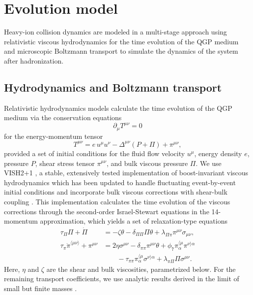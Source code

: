\documentclass[aps,prc,reprint,amsmath,nofootinbib,noeprint]{revtex4-1}
\begin{document}
\section{Evolution model}

Heavy-ion collision dynamics are modeled in a multi-stage approach using relativistic viscous hydrodynamics for the time evolution of the QGP medium and microscopic Boltzmann transport to simulate the dynamics of the system after hadronization.

\subsection{Hydrodynamics and Boltzmann transport}

Relativistic hydrodynamics models calculate the time evolution of the QGP medium via the conservation equations
\begin{equation}
  \partial_\mu T^{\mu\nu} = 0
  \label{eq:conservation}
\end{equation}
for the energy-momentum tensor
\begin{equation}
  T^{\mu\nu} = e \, u^\mu u^\nu  - \Delta^{\mu\nu} (P + \Pi) + \pi^{\mu\nu},
\end{equation}
provided a set of initial conditions for the fluid flow velocity $u^\mu$, energy density $e$, pressure $P$, shear stress tensor $\pi^{\mu\nu}$, and bulk viscous pressure $\Pi$.
We use VISH2+1 \cite{Song:2007ux}, a stable, extensively tested implementation of boost-invariant viscous hydrodynamics which has been updated to handle fluctuating event-by-event initial conditions \cite{Shen:2014vra} and incorporate bulk viscous corrections with shear-bulk coupling \cite{Liu:2015bik}.
This implementation calculates the time evolution of the viscous corrections through the second-order Israel-Stewart equations \cite{Israel:1979wp, Israel:1976aa} in the 14-momentum approximation, which yields a set of relaxation-type equations \cite{Denicol:2014vaa, Ryu:2015vwa}
\begin{subequations}
  \label{eq:relaxation}
  \begin{align}
    \tau_\Pi \Pi + \dot{\Pi} &=
      - \zeta \theta - \delta_{\Pi\Pi} \Pi\theta
      + \lambda_{\Pi\pi} \pi^{\mu\nu} \sigma_{\mu\nu}, \\[1ex]
    \tau_\pi \dot{\pi}^{\langle \mu\nu \rangle} + \pi^{\mu\nu} &=
      2\eta\sigma^{\mu\nu} - \delta_{\pi\pi} \pi^{\mu\nu} \theta
      + \phi_7 \pi_\alpha^{\langle \mu} \pi^{\nu \rangle \alpha} \nonumber \\
      &\qquad {} - \tau_{\pi\pi} \pi_\alpha^{\langle \mu}\sigma^{\nu \rangle \alpha}
      + \lambda_{\pi\Pi} \Pi \sigma^{\mu\nu}.
  \end{align}
\end{subequations}
Here, $\eta$ and $\zeta$ are the shear and bulk viscosities, parametrized below.
For the remaining transport coefficients, we use analytic results derived in the limit of small but finite masses \cite{Denicol:2014vaa}.
\end{document}
